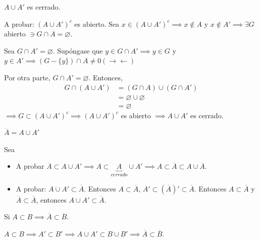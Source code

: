 \begin{prop}
    $A\cup A'$ es cerrado.
    \begin{dem}
        A probar: $(A\cup A')^c$ es abierto. Sea $x\in (A\cup A')^c\implies x\not\in A$ y $x\not\in A'\implies \exists G$ abierto $\ni G\cap A=\varnothing$. 
        \begin{cajita}
            Sea $G\cap A'=\varnothing$. Supóngase que $y\in G\cap A'\implies y \in G$ y $y\in A'\implies (G-\{y\})\cap A\neq 0(\to\gets)$
        \end{cajita}
        Por otra parte, $G\cap A'=\varnothing$. Entonces, 
        \begin{align*}
            G\cap (A\cup A') &= (G\cap A)\cup (G\cap A')\\
            &= \varnothing \cup \varnothing\\
            &= \varnothing
        \end{align*}
        $\implies G\subset (A\cup A')^c\implies (A\cup A')^c$ es abierto $\implies A\cup A'$ es cerrado. 
    \end{dem}
\end{prop}


\begin{prop}
    $\overline{A}=A\cup A'$
    \begin{dem}
        Sea \begin{itemize}
            \item A probar $\overline{A}\subset A\cup A'\implies A\subset \underbrace{A}_{cerrado}\cup A'\implies A\subset \overline{A}\subset A\cup \overline{A}$.
            \item A probar: $A\cup A'\subset \overline{A}$. Entonces $A\subset \overline{A}$, $A'\subset (\overline{A})'\subset \overline{A}$. Entonces $A\subset\overline{A}$ y $\overline{A}\subset \overline{A}$, entonces $A\cup A'\subset \overline{A}$.
        \end{itemize}
    \end{dem}
\end{prop}


\begin{prop}
    Si $A\subset B\implies \overline{A}\subset \overline{B}$.
    \begin{dem}
        $A\subset B\implies A'\subset B'\implies A\cup A'\subset B\cup B'\implies \overline{A}\subset \overline{B}$. 
    \end{dem}
\end{prop}

